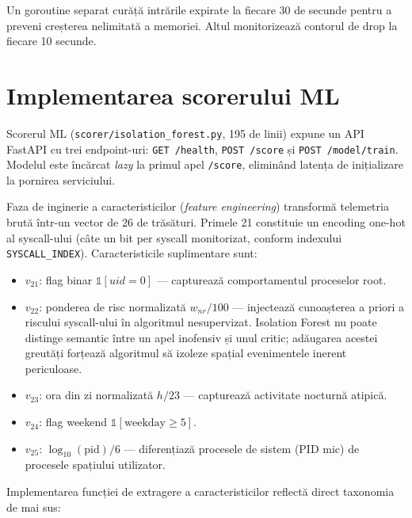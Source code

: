 \par Un goroutine separat curăță intrările expirate la fiecare 30 de secunde pentru a preveni creșterea nelimitată a memoriei. Altul monitorizează contorul de drop la fiecare 10 secunde.


\section{Implementarea scorerului ML}
\label{sec:scorer_impl}

\par Scorerul ML (\texttt{scorer/isolation\_forest.py}, 195 de linii) expune un API FastAPI cu trei endpoint-uri: \texttt{GET /health}, \texttt{POST /score} și \texttt{POST /model/train}. Modelul este încărcat \textit{lazy} la primul apel \texttt{/score}, eliminând latența de inițializare la pornirea serviciului.

\par Faza de inginerie a caracteristicilor (\textit{feature engineering}) transformă telemetria brută într-un vector de 26 de trăsături. Primele 21 constituie un encoding one-hot al syscall-ului (câte un bit per syscall monitorizat, conform indexului \texttt{SYSCALL\_INDEX}). Caracteristicile suplimentare sunt:

\begin{itemize}
    \item $v_{21}$: flag binar $\mathbb{1}[uid = 0]$ --- capturează comportamentul proceselor root.
    \item $v_{22}$: ponderea de risc normalizată $w_{nr}/100$ --- injectează cunoașterea a priori a riscului syscall-ului în algoritmul nesupervizat. Isolation Forest nu poate distinge semantic între un apel inofensiv și unul critic; adăugarea acestei greutăți forțează algoritmul să izoleze spațial evenimentele inerent periculoase.
    \item $v_{23}$: ora din zi normalizată $h/23$ --- capturează activitate nocturnă atipică.
    \item $v_{24}$: flag weekend $\mathbb{1}[\text{weekday} \geq 5]$.
    \item $v_{25}$: $\log_{10}(\text{pid})/6$ --- diferențiază procesele de sistem (PID mic) de procesele spațiului utilizator.
\end{itemize}

\par Implementarea funcției de extragere a caracteristicilor reflectă direct taxonomia de mai sus:

